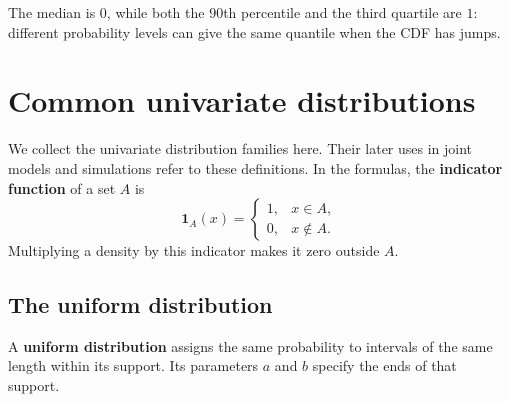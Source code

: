 \documentclass[a4paper,12pt,oneside]{report}
\begin{document}
\begin{center}
\end{center}
The median is $0$, while both the $90$th percentile and the third
quartile are $1$: different probability levels can give the same
quantile when the CDF has jumps.

\section{Common univariate distributions}

We collect the univariate distribution families here. Their later
uses in joint models and simulations refer to these definitions.
In the formulas, the \textbf{indicator function} of a set $A$ is
\[
  \mathbf1_A(x)=
  \begin{cases}1,&x\in A,\\0,&x\notin A.\end{cases}
\]
Multiplying a density by this indicator makes it zero outside $A$.

\subsection{The uniform distribution}
\label{sec:uniform-distribution}
A \textbf{uniform distribution} assigns the same probability to
intervals of the same length within its support. Its parameters
$a$ and $b$ specify the ends of that support.
\end{document}
